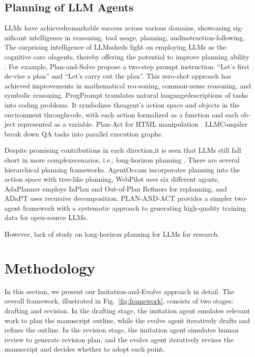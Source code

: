 \documentclass[manuscript,review,anonymous]{acmart}
\begin{document}
\subsection{Planning of LLM Agents}
LLMs have achievedremarkable success across various domains, showcasing sig-nificant intelligence in reasoning, tool usage, planning, andinstruction-following. The surprising intelligence of LLMssheds light on employing LLMs as the cognitive core ofagents, thereby offering the potential to improve planning ability \cite{huang2024understanding}. For example, Plan-and-Solve \cite{wang2023plan} propose a two-step prompt instruction: “Let’s first de-vise a plan” and “Let’s carry out the plan”. This zero-shot approach has achieved improvements in mathematical rea-soning, common-sense reasoning, and symbolic reasoning. ProgPrompt \cite{singh2023progprompt} translates natural languagedescriptions of tasks into coding problems. It symbolizes theagent’s action space and objects in the environment throughcode, with each action formalized as a function and each ob-ject represented as a variable. Plan-Act \cite{erdogan2025planact} for HTML manipulation .  LLMCompiler \cite{kim2024llm} break down QA tasks into parallel execution graphs.

Despite promising contributions in each direction,it is seen that LLMs still fall short in more complexscenarios, i.e., long-horizon planning \cite{chen2024can}.  There are several hierarchical planning frameworks. AgentOccam \cite{yangagentoccam} incorporates planning into the action space with tree-like planning, WebPilot \cite{zhang2025webpilot} uses six
different agents, AdaPlanner \cite{sun2023adaplanner} employs InPlan and Out-of-Plan Refiners for replanning, and ADaPT \cite{prasad2024adapt} uses recursive decomposition. PLAN-AND-ACT \cite{erdogan2025plan} provides a simpler two-agent framework with a systematic approach to generating high-quality training data for open-source LLMs.

However, lack of study on long-horizon planning for LLMs for research.

\section{Methodology}

In this section, we present our Imitation-and-Evolve approach in detail. The overall framework, illustrated in Fig.~\ref{fig:framework}, consists of two stages: drafting and revision. In the drafting stage, the imitation agent emulates relevant work to plan the manuscript outline, while the evolve agent iteratively drafts and refines the outline. In the revision stage, the imitation agent simulates human review to generate revision plan, and the evolve agent iteratively revises the manuscript and decides whether to adopt each point.
\end{document}
